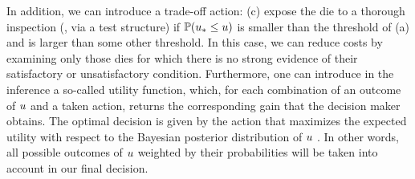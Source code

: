 In addition, we can introduce a trade-off action: (c) expose the die to a thorough inspection (\eg, via a test structure) if $\mathbb{P}(u_* \leq u)$ is smaller than the threshold of (a) and is larger than some other threshold. In this case, we can reduce costs by examining only those dies for which there is no strong evidence of their satisfactory or unsatisfactory condition.
Furthermore, one can introduce in the inference a so-called utility function, which, for each combination of an outcome of $u$ and a taken action, returns the corresponding gain that the decision maker obtains. The optimal decision is given by the action that maximizes the expected utility with respect to the Bayesian posterior distribution of $u$ \cite{bernardo2007}. In other words, all possible outcomes of $u$ weighted by their probabilities will be taken into account in our final decision.
